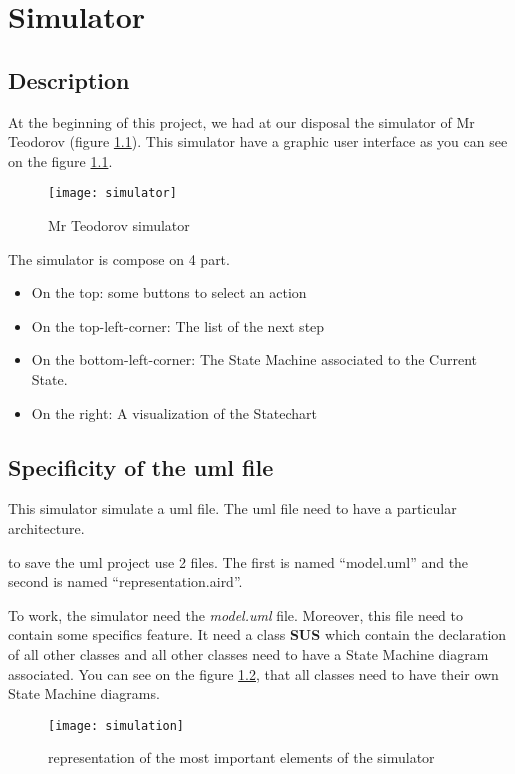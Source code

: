 
\chapter{Simulator}
\label{chap:simulator}
\section{Description}


At the beginning of this project, we had at our disposal the simulator of Mr Teodorov (figure \ref{fig:sim}). This simulator have a graphic user interface as you can see on the figure \ref{fig:sim}.


\begin{figure}[h]
  \centering
  \texttt{[image: simulator]}
  \caption{Mr Teodorov simulator}
  \label{fig:sim}
\end{figure}


The simulator is compose on 4 part.
\begin{itemize}
\item On the top: some buttons to select an action
\item On the top-left-corner: The list of the next step
\item On the bottom-left-corner: The State Machine associated to the Current State.
\item On the right: A visualization of the Statechart
\end{itemize}

\section{Specificity of the uml file}

This simulator simulate a uml file. The uml file need to have a particular architecture.

\umld to save the uml project use 2 files. The first is named ``model.uml'' and the second is named ``representation.aird''.

To work, the simulator need the \textit{model.uml} file. Moreover, this file need to contain some specifics feature. It need a class \textbf{SUS} which contain the declaration of all other classes and all other classes need to have a State Machine diagram associated. You can see on the figure \ref{fig:simulateur}, that all classes need to have their own State Machine diagrams.

\begin{figure}[h!]
  \centering
  \texttt{[image: simulation]}
  \caption{representation of the most important elements of the simulator}
  \label{fig:simulateur}
\end{figure}




